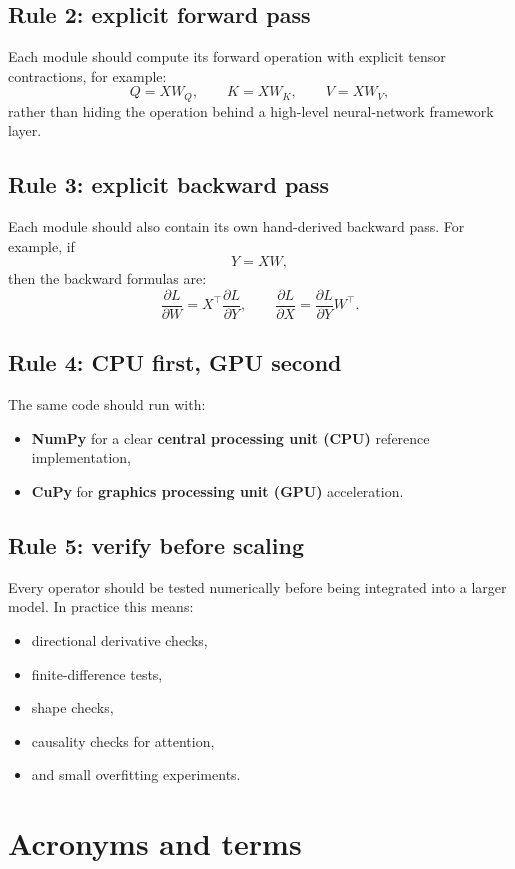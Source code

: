 \documentclass[11pt]{article}
\begin{document}
\subsection*{Rule 2: explicit forward pass}
Each module should compute its forward operation with explicit tensor contractions,
for example:
\[
Q = XW_Q,\qquad K = XW_K,\qquad V = XW_V,
\]
rather than hiding the operation behind a high-level neural-network framework layer.

\subsection*{Rule 3: explicit backward pass}
Each module should also contain its own hand-derived backward pass.
For example, if
\[
Y = XW,
\]
then the backward formulas are:
\[
\frac{\partial L}{\partial W} = X^\top \frac{\partial L}{\partial Y},
\qquad
\frac{\partial L}{\partial X} = \frac{\partial L}{\partial Y}W^\top.
\]

\subsection*{Rule 4: CPU first, GPU second}
The same code should run with:
\begin{itemize}[leftmargin=1.5em]
    \item \textbf{NumPy} for a clear \textbf{central processing unit (CPU)} reference implementation,
    \item \textbf{CuPy} for \textbf{graphics processing unit (GPU)} acceleration.
\end{itemize}

\subsection*{Rule 5: verify before scaling}
Every operator should be tested numerically before being integrated into a larger model.
In practice this means:
\begin{itemize}[leftmargin=1.5em]
    \item directional derivative checks,
    \item finite-difference tests,
    \item shape checks,
    \item causality checks for attention,
    \item and small overfitting experiments.
\end{itemize}

\section{Acronyms and terms}
\end{document}
